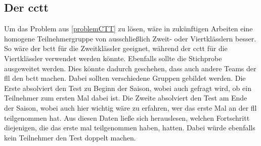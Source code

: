 \subsection{Der \acrlong{cctt}}
Um das Problem aus \ref{problemCTT} zu lösen, wäre in zukünftigen Arbeiten eine homogene Teilnehmergruppe von ausschließlich Zweit- oder Viertklässlern besser.\\
So wäre der \acrshort{bctt} für die Zweitklässler geeignet, während der \acrshort{cctt} für die Viertklässler verwendet werden könnte.
Ebenfalls sollte die Stichprobe ausgeweitet werden. Dies könnte dadurch geschehen, dass auch andere Teams der \acrshort{fll} den \acrshort{bctt} machen. Dabei sollten verschiedene Gruppen gebildet werden. Die Erste absolviert den Test zu Beginn der Saison, wobei auch gefragt wird, ob ein Teilnehmer zum ersten Mal dabei ist. Die Zweite absolviert den Test am Ende der Saison, wobei auch hier wichtig wäre zu erfahren, wer das erste Mal an der \acrshort{fll} teilgenommen hat. Aus diesen Daten ließe sich herauslesen, welchen Fortschritt diejenigen, die das erste mal teilgenommen haben, hatten. Dabei würde ebenfalls kein Teilnehmer den Test doppelt machen.



